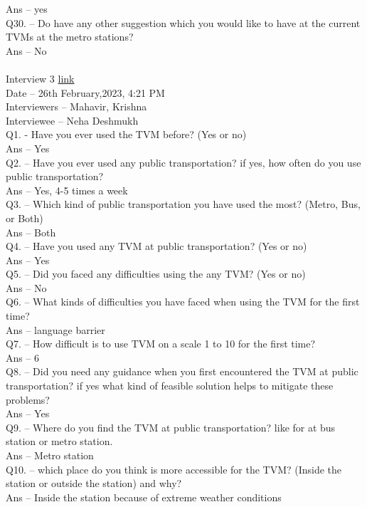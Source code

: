 \documentclass[a4paper, 11pt]{report}
\begin{document}
Ans – yes\\
Q30. – Do have any other suggestion which you would like to have at the current TVMs at the metro stations? \\
Ans – No\\
\\
Interview 3 \href{https://drive.google.com/file/d/1PnpT-WOk3Vlpm_ruteeafrvHmelRFpJE/view?usp=share_link}{link} \\
Date – 26th February,2023, 4:21 PM\\
Interviewers – Mahavir, Krishna\\
Interviewee – Neha Deshmukh\\
Q1. - Have you ever used the TVM before? (Yes or no) \\
Ans – Yes\\
Q2. – Have you ever used any public transportation? if yes, how often do you use public transportation? \\
Ans – Yes, 4-5 times a week\\
Q3. – Which kind of public transportation you have used the most? (Metro, Bus, or Both)  \\
Ans – Both\\
Q4. – Have you used any TVM at public transportation? (Yes or no) \\
Ans – Yes \\
Q5. – Did you faced any difficulties using the any TVM? (Yes or no) \\
Ans – No\\
Q6. – What kinds of difficulties you have faced when using the TVM for the first time? \\
Ans – language barrier  \\
Q7. – How difficult is to use TVM on a scale 1 to 10 for the first time? \\
Ans – 6\\
Q8. – Did you need any guidance when you first encountered the TVM at public transportation? if yes what kind of feasible solution helps to mitigate these problems? \\
Ans – Yes\\
Q9. – Where do you find the TVM at public transportation? like for at bus station or metro station. \\
Ans – Metro station\\
Q10. – which place do you think is more accessible for the TVM? (Inside the station or outside the station) and why? \\
Ans – Inside the station because of extreme weather conditions \\
\end{document}
